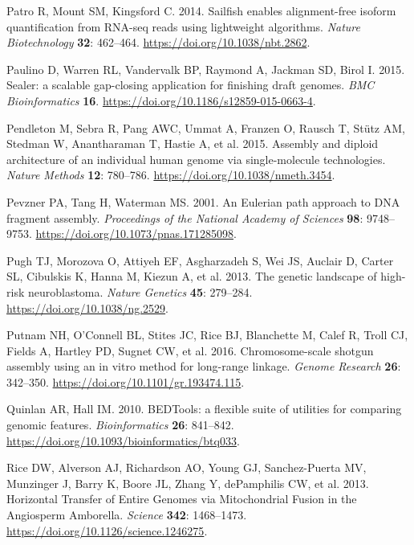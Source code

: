 \documentclass[
  12pt,
  oneside,
  openany]{book}
\begin{document}
\leavevmode\hypertarget{ref-Patro_2014}{}%
Patro R, Mount SM, Kingsford C. 2014. Sailfish enables alignment-free isoform quantification from RNA-seq reads using lightweight algorithms. \emph{Nature Biotechnology} \textbf{32}: 462--464. \url{https://doi.org/10.1038/nbt.2862}.

\leavevmode\hypertarget{ref-Paulino_2015}{}%
Paulino D, Warren RL, Vandervalk BP, Raymond A, Jackman SD, Birol I. 2015. Sealer: a scalable gap-closing application for finishing draft genomes. \emph{BMC Bioinformatics} \textbf{16}. \url{https://doi.org/10.1186/s12859-015-0663-4}.

\leavevmode\hypertarget{ref-Pendleton_2015}{}%
Pendleton M, Sebra R, Pang AWC, Ummat A, Franzen O, Rausch T, Stütz AM, Stedman W, Anantharaman T, Hastie A, et al. 2015. Assembly and diploid architecture of an individual human genome via single-molecule technologies. \emph{Nature Methods} \textbf{12}: 780--786. \url{https://doi.org/10.1038/nmeth.3454}.

\leavevmode\hypertarget{ref-Pevzner_2001}{}%
Pevzner PA, Tang H, Waterman MS. 2001. An Eulerian path approach to DNA fragment assembly. \emph{Proceedings of the National Academy of Sciences} \textbf{98}: 9748--9753. \url{https://doi.org/10.1073/pnas.171285098}.

\leavevmode\hypertarget{ref-Pugh_2013}{}%
Pugh TJ, Morozova O, Attiyeh EF, Asgharzadeh S, Wei JS, Auclair D, Carter SL, Cibulskis K, Hanna M, Kiezun A, et al. 2013. The genetic landscape of high-risk neuroblastoma. \emph{Nature Genetics} \textbf{45}: 279--284. \url{https://doi.org/10.1038/ng.2529}.

\leavevmode\hypertarget{ref-Putnam_2016}{}%
Putnam NH, O'Connell BL, Stites JC, Rice BJ, Blanchette M, Calef R, Troll CJ, Fields A, Hartley PD, Sugnet CW, et al. 2016. Chromosome-scale shotgun assembly using an in vitro method for long-range linkage. \emph{Genome Research} \textbf{26}: 342--350. \url{https://doi.org/10.1101/gr.193474.115}.

\leavevmode\hypertarget{ref-Quinlan_2010}{}%
Quinlan AR, Hall IM. 2010. BEDTools: a flexible suite of utilities for comparing genomic features. \emph{Bioinformatics} \textbf{26}: 841--842. \url{https://doi.org/10.1093/bioinformatics/btq033}.

\leavevmode\hypertarget{ref-Rice_2013}{}%
Rice DW, Alverson AJ, Richardson AO, Young GJ, Sanchez-Puerta MV, Munzinger J, Barry K, Boore JL, Zhang Y, dePamphilis CW, et al. 2013. Horizontal Transfer of Entire Genomes via Mitochondrial Fusion in the Angiosperm Amborella. \emph{Science} \textbf{342}: 1468--1473. \url{https://doi.org/10.1126/science.1246275}.
\end{document}
